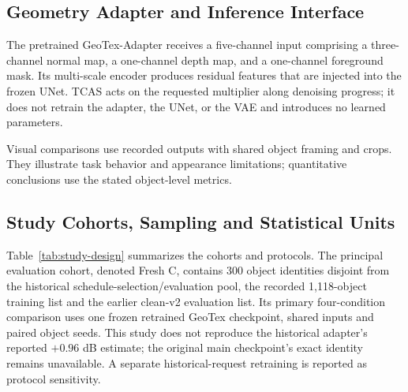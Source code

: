 \documentclass[times,twocolumn,final]{elsarticle}
\begin{document}
\subsection{Geometry Adapter and Inference Interface}
\label{subsec:adapterimpl}

The pretrained GeoTex-Adapter receives a five-channel input comprising a three-channel normal map, a one-channel depth map, and a one-channel foreground mask. Its multi-scale encoder produces residual features that are injected into the frozen UNet. TCAS acts on the requested multiplier along denoising progress; it does not retrain the adapter, the UNet, or the VAE and introduces no learned parameters.

Visual comparisons use recorded outputs with shared object framing and crops. They illustrate task behavior and appearance limitations; quantitative conclusions use the stated object-level metrics.

\subsection{Study Cohorts, Sampling and Statistical Units}
\label{subsec:setup}

Table~\ref{tab:study-design} summarizes the cohorts and protocols. The principal evaluation cohort, denoted Fresh C, contains 300 object identities disjoint from the historical schedule-selection/evaluation pool, the recorded 1,118-object training list and the earlier clean-v2 evaluation list. Its primary four-condition comparison uses one frozen retrained GeoTex checkpoint, shared inputs and paired object seeds. This study does not reproduce the historical adapter's reported $+0.96$ dB estimate; the original main checkpoint's exact identity remains unavailable. A separate historical-request retraining is reported as protocol sensitivity.
\end{document}

